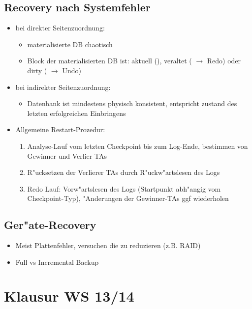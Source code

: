 \documentclass[a4paper, 12pt]{scrartcl}
\begin{document}
\subsection{Recovery nach Systemfehler}
\begin{itemize}
	\item
		bei direkter Seitenzuordnung:
		\begin{itemize}
			\item
				materialisierte DB chaotisch
			\item
				Block der materialisierten DB ist: aktuell (\checkmark), veraltet ( $\rightarrow$ Redo) oder dirty ( $\rightarrow$ Undo)
		\end{itemize}
	\item
		bei indirekter Seitenzuordnung:
		\begin{itemize}
			\item
				Datenbank ist mindestens physisch konsistent, entspricht zustand des letzten erfolgreichen Einbringens
		\end{itemize}
	\item
		Allgemeine Restart-Prozedur:
		\begin{enumerate}
			\item
				Analyse-Lauf vom letzten Checkpoint bis zum Log-Ende, bestimmen von Gewinner und Verlier TAs
			\item
				R"ucksetzen der Verlierer TAs durch R"uckw"artslesen des Logs
			\item
				Redo Lauf: Vorw"artslesen des Logs (Startpunkt abh"angig vom Checkpoint-Typ), "Anderungen der Gewinner-TAs ggf wiederholen
		\end{enumerate}
\end{itemize}

\subsection{Ger"ate-Recovery}
\begin{itemize}
	\item
		Meist Plattenfehler, versuchen die zu reduzieren (z.B. RAID)
	\item
		Full vs Incremental Backup
\end{itemize}








\newpage
\section{Klausur WS 13/14}
\setcounter{section}{0}
\end{document}
